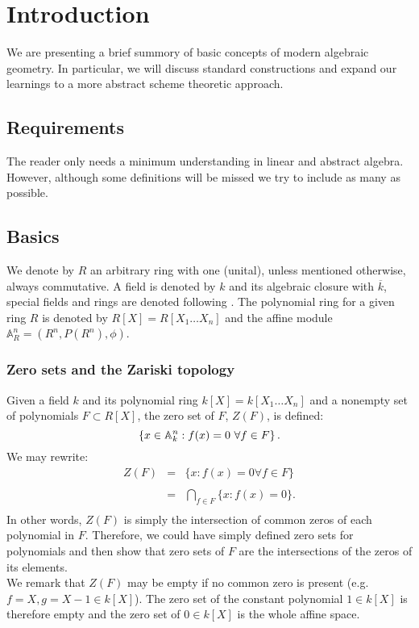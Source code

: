 
\section{Introduction}
We are presenting a brief summory of basic concepts of modern algebraic geometry. In particular, we will discuss standard constructions and expand our learnings to a more abstract scheme theoretic approach.
\subsection{Requirements}
The reader only needs a minimum understanding in linear and abstract algebra. However, although some definitions will be missed we try to include as many as possible.\\
\subsection{Basics}
\indent We denote by $R$ an arbitrary ring with one (unital), unless mentioned otherwise, always commutative. A field is denoted by $k$ and its algebraic closure with $\overline{k}$, special fields and rings are denoted following \cite{Bour}. The polynomial ring for a given ring $R$ is denoted by $R[X] = R[X_1\ldots X_n]$ and the affine module $\mathbb{A}^n_R = (R^n, P(R^n), \phi)$.
\subsubsection{Zero sets and the Zariski topology}
Given a field $k$ and its polynomial ring $k[X] = k[X_1\ldots X_n]$ and a nonempty set of polynomials $F \subset R[X]$, the zero set of $F$, $Z(F)$, is defined:
$$\left\{x \in \mathbb{A}^n_{k} : f(x) = 0 \ \forall f \in F\right\}.$$
We may rewrite:
$$\begin{array}{rcl}
Z(F) &=& \{x : f(x) = 0 \forall f \in F\}\\&&\\
&=& \bigcap_{f \in F} \{x : f(x) = 0\}.\\
\end{array}$$
In other words, $Z(F)$ is simply the intersection of common zeros of  each polynomial in $F$. Therefore, we could have simply defined zero sets for polynomials and then show that zero sets of $F$ are the intersections of the zeros of its elements.\\
\indent We remark that $Z(F)$ may be empty if no common zero is present (e.g. $f = X, g = X - 1 \in k[X]$). The zero set of the constant polynomial $1 \in k[X]$ is therefore empty and the zero set of $0 \in k[X]$ is the whole affine space.\\
